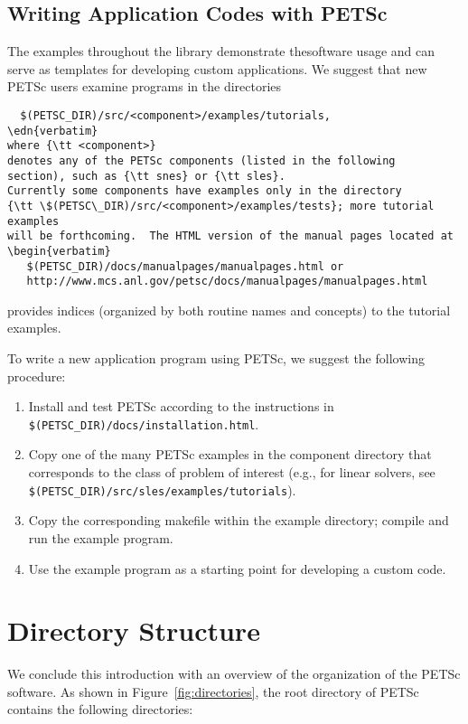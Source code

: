 \subsection*{Writing Application Codes with PETSc}

The examples throughout the library demonstrate thesoftware usage
and can serve as templates for developing
custom applications.  We suggest that new PETSc
users examine programs in the directories 
\begin{verbatim}
  $(PETSC_DIR)/src/<component>/examples/tutorials,
\edn{verbatim}
where {\tt <component>}
denotes any of the PETSc components (listed in the following
section), such as {\tt snes} or {\tt sles}.  
Currently some components have examples only in the directory
{\tt \$(PETSC\_DIR)/src/<component>/examples/tests}; more tutorial examples
will be forthcoming.  The HTML version of the manual pages located at
\begin{verbatim}
   $(PETSC_DIR)/docs/manualpages/manualpages.html or 
   http://www.mcs.anl.gov/petsc/docs/manualpages/manualpages.html
\end{verbatim}
provides indices (organized by both routine names and concepts) to the tutorial examples.

To write a new application program using PETSc, we suggest the
following procedure:
\begin{enumerate}
\item Install and test PETSc according to the instructions in 
      {\tt \$(PETSC\_DIR)/docs/installation.html}.
\item Copy one of the many PETSc examples in the component directory
      that corresponds to the class of problem of interest (e.g.,
      for linear solvers, see {\tt \$(PETSC\_DIR)/src/sles/examples/tutorials}).
\item Copy the corresponding makefile within the example directory;
      compile and run the example program.
\item Use the example program as a starting point for developing a custom code.
\end{enumerate}


\section{Directory Structure}

We conclude this introduction with an overview of the
organization of the PETSc software.  As shown in Figure~\ref{fig:directories},
the root directory of PETSc contains the following directories:

